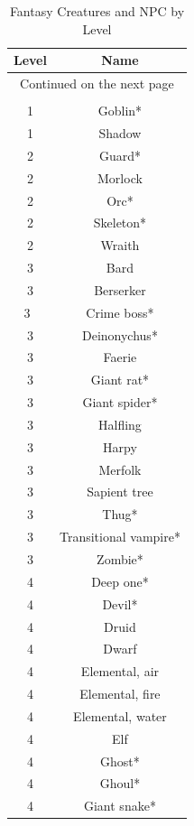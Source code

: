 \begin{longtable}{|c|c|}
\caption{Fantasy Creatures and NPC by Level} \label{tab:Fantasy Creatures and NPC by Level}\\
\hline
\textbf{Level} & \textbf{Name} \\
\hline
\endhead

\multicolumn{2}{|c|}{Continued on the next page} \\ \hline
\endfoot

\multicolumn{2}{|c|}{End of table} \\ \hline
\endlastfoot

1 & Goblin* \\ \hline
1 & Shadow \\ \hline
2 & Guard* \\ \hline
2 & Morlock \\ \hline
2 & Orc* \\ \hline
2 & Skeleton* \\ \hline
2 & Wraith \\ \hline
3 & Bard \\ \hline
3 & Berserker \\ \hline
3  & Crime boss* \\ \hline
3 & Deinonychus* \\ \hline
3 & Faerie \\ \hline
3 & Giant rat* \\ \hline
3 & Giant spider* \\ \hline
3 & Halfling \\ \hline
3 & Harpy \\ \hline
3 & Merfolk \\ \hline
3 & Sapient tree \\ \hline
3 & Thug* \\ \hline
3 & Transitional vampire* \\ \hline
3 & Zombie* \\ \hline
4 & Deep one* \\ \hline
4 & Devil* \\ \hline
4 & Druid \\ \hline
4 & Dwarf \\ \hline
4 & Elemental, air \\ \hline
4 & Elemental, fire \\ \hline
4 & Elemental, water \\ \hline
4 & Elf \\ \hline
4 & Ghost* \\ \hline
4 & Ghoul* \\ \hline
4 & Giant snake* \\ \hline

\end{longtable}
